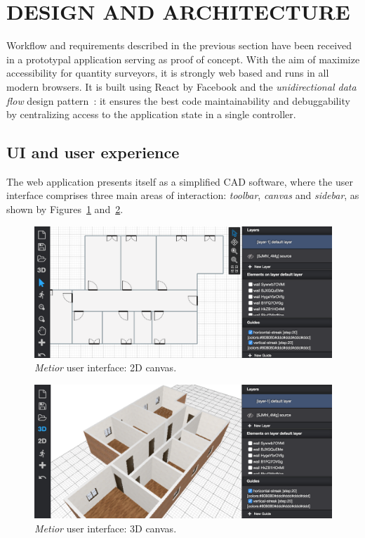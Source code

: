 \documentclass[a4paper,twoside]{article}
\begin{document}
%
\section{\uppercase{Design and Architecture}}
\label{sec:architecture}


\noindent
Workflow and requirements described in the previous section have been received in a prototypal application serving as proof of concept. With the aim of maximize accessibility for quantity surveyors, it is strongly web based and runs in all modern browsers. It is built using React by Facebook and the \emph{unidirectional data flow} design pattern~\cite{redux}:  it ensures the best code maintainability and debuggability by centralizing access to the application state in a single controller.

\subsection{UI and user experience}

\noindent
The web application presents itself as a simplified CAD software, where the user interface comprises three main areas of interaction: \emph{toolbar}, \emph{canvas} and \emph{sidebar}, as shown by Figures~\ref{fig:ui2d} and~\ref{fig:ui3d}.

\begin{figure}[htbp] %
   \centering
   \includegraphics[width=1\linewidth]{images/2d}
   \caption{\emph{Metior} user interface: 2D canvas.}
   \label{fig:ui2d}
\end{figure}

\begin{figure}[htbp]
   \includegraphics[width=1\linewidth]{images/3d}
   \caption{\emph{Metior} user interface: 3D canvas.}
   \label{fig:ui3d}
\end{figure}
\end{document}
